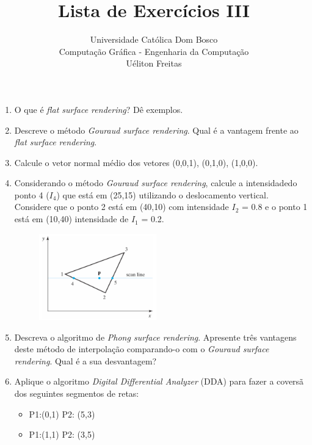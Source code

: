 \documentclass[12pt,a4paper]{article}
\author{Universidade Católica Dom Bosco \\ Computação Gráfica - Engenharia da Computação \\Uéliton Freitas}
\title{Lista de Exercícios III}
\begin{document}
\maketitle


\begin{enumerate}
	\item O que  é \textit{flat surface rendering}? Dê exemplos.

	\item Descreve o método \textit{Gouraud surface rendering}. Qual  é a vantagem frente ao \textit{flat surface rendering}.
	
	\item Calcule o vetor normal médio dos vetores (0,0,1), (0,1,0), (1,0,0).
	
	\item Considerando o método \textit{Gouraud surface rendering}, calcule a intensidadedo ponto 4 ($I_4$) que está em (25,15) utilizando o deslocamento vertical.
Considere que o ponto 2 está em (40,10) com intensidade $I_2$ = 0.8 e o
ponto 1 está em (10,40) intensidade de $I_1$ = 0.2.

	\begin{figure}[!h]
		\label{Fig:are}
			\begin{center}
			\includegraphics[width=0.48\textwidth]{PIC}
			\end{center}
	\end{figure}
	
	\item Descreva o algoritmo de \textit{Phong surface rendering}. Apresente três vantagens deste método de interpolação comparando-o com o \textit{Gouraud surface
rendering}. Qual é a sua desvantagem?

	\item Aplique o algoritmo \textit{Digital Differential Analyzer} (DDA) para fazer a coversã dos seguintes segmentos de retas:
		\begin{itemize}
			\item P1:(0,1) P2: (5,3)\\
			\item P1:(1,1) P2: (3,5)\\
		\end{itemize}
		

\end{enumerate}
\end{document}
